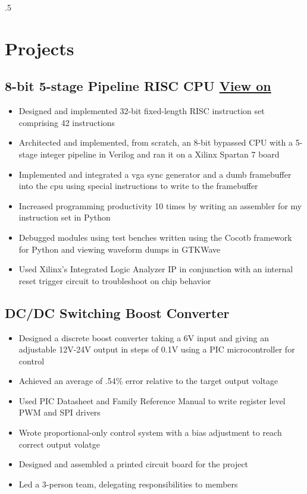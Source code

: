 \documentclass{article}
\begin{document}
\begin{spacing}{.5}
{\section{Projects}
	\subsection{8-bit 5-stage Pipeline RISC CPU \hspace{.1cm} \href{https://github.com/ZachWWalden/HdlMicroProcessor}{View on \faGithub} \hfill {}}
		\begin{itemize}[label=--,itemsep=-.35ex]
			\item \large{Designed and implemented 32-bit fixed-length RISC instruction set comprising 42 instructions}
			\item \large{Architected and implemented, from scratch, an 8-bit bypassed CPU with a 5-stage integer pipeline in Verilog and ran it on a Xilinx Spartan 7 board}
			\item \large{Implemented and integrated a vga sync generator and a dumb framebuffer into the cpu using special instructions to write to the framebuffer}
			\item \large{Increased programming productivity 10 times by writing an assembler for my instruction set in Python}
			\item \large{Debugged modules using test benches written using the Cocotb framework for Python and viewing waveform dumps in GTKWave}
			\item \large{Used Xilinx's Integrated Logic Analyzer IP in conjunction with an internal reset trigger circuit to troubleshoot on chip behavior}
		\end{itemize}
	\subsection{DC/DC Switching Boost Converter \hfill {}}
		\begin{itemize}[label=--,itemsep=-.35ex]
			\item \large{Designed a discrete boost converter taking a 6V input and giving an adjustable 12V-24V output in steps of 0.1V using a PIC microcontroller for control}
			\item \large{Achieved an average of .54\% error relative to the target output voltage}
			\item \large{Used PIC Datasheet and Family Reference Manual to write register level PWM and SPI drivers}
			\item \large{Wrote proportional-only control system with a bias adjustment to reach correct output volatge}
			\item \large{Designed and assembled a printed circuit board for the project}
			\item \large{Led a 3-person team, delegating responsibilities to members}
		\end{itemize}
}
\end{spacing}
\end{document}
